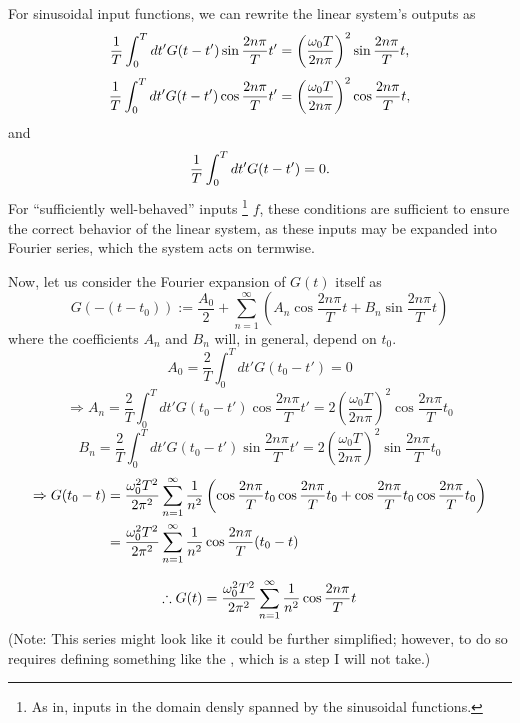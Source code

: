 \item

For sinusoidal input functions, we can rewrite the linear system's outputs as
\[
    \frac{1}{T} \int_0^T dt' G(t - t') \sin \frac{2n\pi}{T}t'
    = {\left( \frac{\omega_0 T}{2n\pi} \right)}^2 \sin \frac{2n\pi}{T}t,
\]
\[
    \frac{1}{T} \int_0^T dt' G(t - t') \cos \frac{2n\pi}{T}t'
    = {\left( \frac{\omega_0 T}{2n\pi} \right)}^2 \cos \frac{2n\pi}{T}t,
\]
and
\[
    \frac{1}{T} \int_0^T dt' G(t - t') = 0.
\]
For ``sufficiently well-behaved'' inputs%
\footnote{As in, inputs in the domain densly spanned by the sinusoidal functions.} $f$,
these conditions are sufficient to ensure the correct behavior of the linear system,
as these inputs may be expanded into Fourier series, which the system acts on termwise.

Now, let us consider the Fourier expansion of $G(t)$ itself as
\[
    G(-(t - t_0))
    := \frac{A_0}{2} + \sum_{n=1}^\infty \left(
        A_n \cos \frac{2n\pi}{T}t + B_n \sin \frac{2n\pi}{T}t
    \right)
\]
where the coefficients $A_n$ and $B_n$ will, in general, depend on $t_0$.
\[
    A_0
    = \frac{2}{T} \int_0^T dt' G(t_0 - t')
    = 0
\]
\[
    \Rightarrow A_n
    = \frac{2}{T} \int_0^T dt' G(t_0 - t') \cos \frac{2n\pi}{T}t'
    = 2 {\left( \frac{\omega_0 T}{2n\pi} \right)}^2 \cos \frac{2n\pi}{T}t_0
\]
\[
    B_n
    = \frac{2}{T} \int_0^T dt' G(t_0 - t') \sin \frac{2n\pi}{T}t'
    = 2 {\left( \frac{\omega_0 T}{2n\pi} \right)}^2 \sin \frac{2n\pi}{T}t_0
\]
\begin{align*}
    \Rightarrow G(t_0 - t)
    &= \frac{\omega_0^2  T^2}{2\pi^2} \sum_{n=1}^\infty \frac{1}{n^2} \left(
        \cos \frac{2n\pi}{T}t_0 \cos \frac{2n\pi}{T}t_0
        + \cos \frac{2n\pi}{T}t_0 \cos \frac{2n\pi}{T}t_0
    \right) \\
    &= \frac{\omega_0^2  T^2}{2\pi^2} \sum_{n=1}^\infty \frac{1}{n^2} \cos \frac{2n\pi}{T} (t_0 - t)
\end{align*}

\[
    \therefore G(t)
    = \frac{\omega_0^2  T^2}{2\pi^2} \sum_{n=1}^\infty \frac{1}{n^2} \cos \frac{2n\pi}{T} t
\]
(Note: This series might look like it could be further simplified;
however, to do so requires defining something like the ,
which is a step I will not take.)